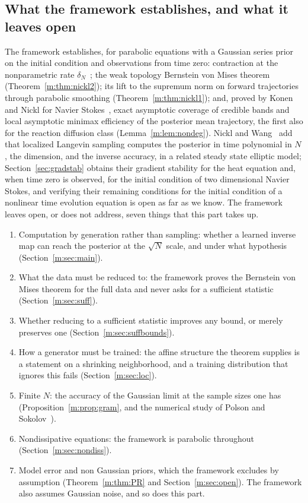 \subsection{What the framework establishes, and what it leaves open}\label{m:sec:gaps}

The framework establishes, for parabolic equations with a Gaussian series prior on the initial condition and observations from time zero: contraction at the nonparametric rate $\delta_N$~\cite{nickltiti2024,nicklbvm2024}; the weak topology Bernstein von Mises theorem (Theorem~\ref{m:thm:nickl2}); its lift to the supremum norm on forward trajectories through parabolic smoothing (Theorem~\ref{m:thm:nickl1}); and, proved by Konen and Nickl for Navier Stokes~\cite{konennickl2026}, exact asymptotic coverage of credible bands and local asymptotic minimax efficiency of the posterior mean trajectory, the first also for the reaction diffusion class (Lemma~\ref{m:lem:nondeg}). Nickl and Wang~\cite{nicklwang2024} add that localized Langevin sampling computes the posterior in time polynomial in $N$, the dimension, and the inverse accuracy, in a related steady state elliptic model; Section~\ref{sec:gradstab} obtains their gradient stability for the heat equation and, when time zero is observed, for the initial condition of two dimensional Navier Stokes, and verifying their remaining conditions for the initial condition of a nonlinear time evolution equation is open as far as we know. The framework leaves open, or does not address, seven things that this part takes up.

\begin{enumerate}
\item Computation by generation rather than sampling: whether a learned inverse map can reach the posterior at the $\sqrt N$ scale, and under what hypothesis (Section~\ref{m:sec:main}).
\item What the data must be reduced to: the framework proves the Bernstein von Mises theorem for the full data and never asks for a sufficient statistic (Section~\ref{m:sec:suff}).
\item Whether reducing to a sufficient statistic improves any bound, or merely preserves one (Section~\ref{m:sec:suffbounds}).
\item How a generator must be trained: the affine structure the theorem supplies is a statement on a shrinking neighborhood, and a training distribution that ignores this fails (Section~\ref{m:sec:loc}).
\item Finite $N$: the accuracy of the Gaussian limit at the sample sizes one has (Proposition~\ref{m:prop:gram}, and the numerical study of Polson and Sokolov~\cite{polsonsokolov2026}).
\item Nondissipative equations: the framework is parabolic throughout (Section~\ref{m:sec:nondiss}).
\item Model error and non Gaussian priors, which the framework excludes by assumption (Theorem~\ref{m:thm:PR} and Section~\ref{m:sec:open}). The framework also assumes Gaussian noise, and so does this part.
\end{enumerate}

